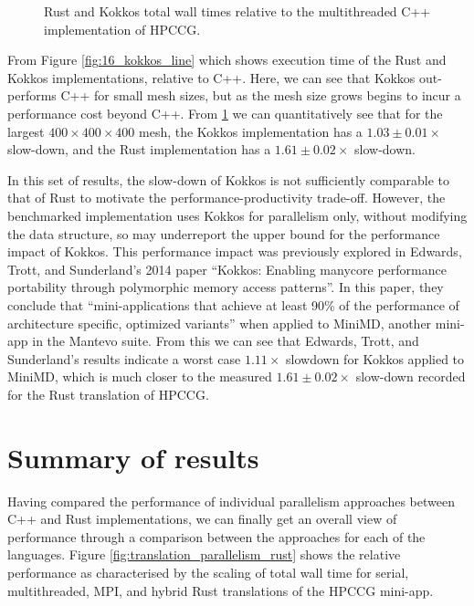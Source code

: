 \begin{figure}[H]
    \centering
    
    \vspace*{-0.5cm}
    \caption{Rust and Kokkos total wall times relative to the multithreaded C++ implementation of HPCCG.}
    \label{fig:17_kokkos_line_relative}
\end{figure}


From Figure \ref{fig:16_kokkos_line} which shows execution time of the Rust and Kokkos implementations, relative to C++. Here, we can see that Kokkos out-performs C++ for small mesh sizes, but as the mesh size grows begins to incur a performance cost beyond C++. From \ref{fig:17_kokkos_line_relative} we can quantitatively see that for the largest $400 \times 400 \times 400$ mesh, the Kokkos implementation has a $1.03 \pm 0.01 \times$ slow-down, and the Rust implementation has a $1.61 \pm 0.02 \times$ slow-down. 

In this set of results, the slow-down of Kokkos is not sufficiently comparable to that of Rust to motivate the performance-productivity trade-off. However, the benchmarked implementation uses Kokkos for parallelism only, without modifying the data structure, so may underreport the upper bound for the performance impact of Kokkos. This performance impact was previously explored in Edwards, Trott, and Sunderland's 2014 paper ``Kokkos: Enabling manycore performance portability through polymorphic memory access patterns''. In this paper, they conclude that ``mini-applications that achieve at least 90\% of the performance of architecture specific, optimized variants'' \cite{carteredwardsKokkosEnablingManycore2014} when applied to MiniMD, another \acrshort{mini-app} in the Mantevo suite. From this we can see that Edwards, Trott, and Sunderland's results indicate a worst case $1.11 \times$ slowdown for Kokkos applied to MiniMD, which is much closer to the measured $1.61 \pm 0.02 \times$ slow-down recorded for the Rust translation of HPCCG.


\section{Summary of results}
\label{sec:performance-results}

Having compared the performance of individual parallelism approaches between C++ and Rust implementations, we can finally get an overall view of performance through a comparison between the approaches for each of the languages. Figure \ref{fig:translation_parallelism_rust} shows the relative performance as characterised by the scaling of total wall time for serial, multithreaded, MPI, and hybrid Rust translations of the HPCCG \acrshort{mini-app}.


